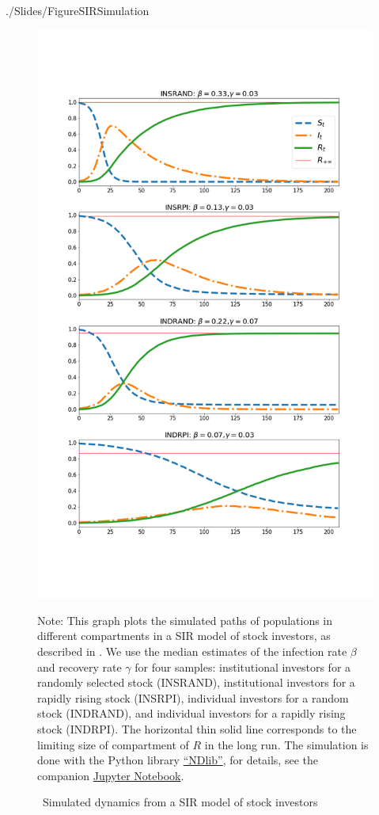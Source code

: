 \begin{verbatimwrite}{./Slides/FigureSIRSimulation}%
	\begin{figure} \centering  %
		\caption{ ~Simulated dynamics from a SIR model of stock investors}
		\label{fig:sir_simulate}
		\centerline{\includegraphics[width=\textwidth,height=\textheight]{./figures/sir_simulate.png}}
		\begin{flushleft}
			{\footnotesize Note: This graph plots the simulated paths of populations in different compartments in a SIR model of stock investors, as described in \cite{shiller1989survey}. We use the median estimates of the infection rate $\beta$ and recovery rate $\gamma$ for four samples: institutional investors for a randomly selected stock (INSRAND), institutional investors for a rapidly rising stock (INSRPI), individual investors for a random stock (INDRAND), and individual investors for a rapidly rising stock (INDRPI). The horizontal thin solid line corresponds to the limiting size of compartment of $R$ in the long run. The simulation is done with the Python library \href{https://ndlib.readthedocs.io/en/latest/}{``NDlib''}, for details, see the companion \href{https://github.com/llorracc/EpiExp/blob/master/SIR_Ndlib.ipynb}{Jupyter Notebook}. }

\end{flushleft}
\end{figure}
\end{verbatimwrite}
